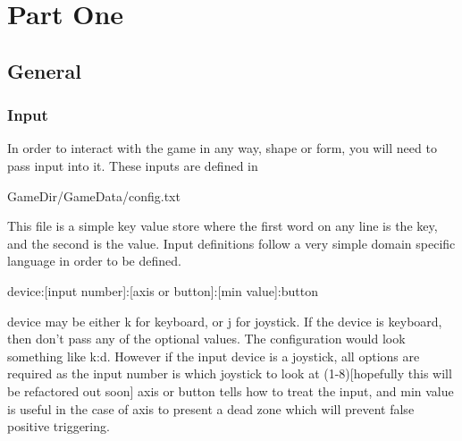 \documentclass[11pt,fleqn]{book} %
\begin{document}

\pagestyle{empty} %

\tableofcontents %

\cleardoublepage %

\pagestyle{fancy} %


\part{Part One}


\chapter{General}

\section{Input}

In order to interact with the game in any way, shape or form, you will need to pass input into it. These inputs are defined in
\begin{theorem}
 GameDir/GameData/config.txt
\end{theorem}
This file is a simple key value store where the first word on any line is the key, and the second is the value. Input definitions follow a very
simple domain specific language in order to be defined.
\begin{theorem}
device:[input number]:[axis or button]:[min value]:button
\end{theorem}
device may be either k for keyboard, or j for joystick. If the device is keyboard, then don't pass any of the optional values. The configuration would look something
like k:d. However if the input device is a joystick, all options are required as the input number is which joystick to look at (1-8)[hopefully this will be refactored out soon]
axis or button tells how to treat the input, and min value is useful in the case of axis to present a dead zone which will prevent false positive triggering.
\end{document}
